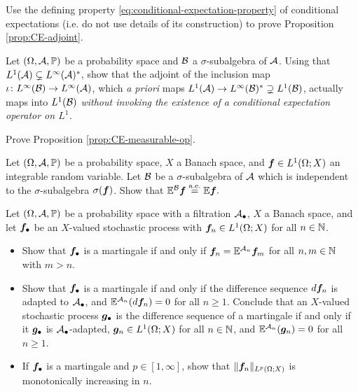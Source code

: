 \begin{exercise}\label{ex:CE-adjoint}
  Use the defining property \eqref{eq:conditional-expectation-property} of conditional expectations (i.e. do not use details of its construction) to prove Proposition \ref{prop:CE-adjoint}.
\end{exercise}

\begin{exercise}\label{ex:conditional-expectation-as-adjoint}
  Let $(\Omega,\mathcal{A},\mathbb{P})$ be a probability space and $\mathcal{B}$ a $\sigma$-subalgebra of $\mathcal{A}$.
  Using that $L^1(\mathcal{A}) \subsetneq L^\infty(\mathcal{A})^*$, show that the adjoint of the inclusion map $\iota \colon L^\infty(\mathcal{B}) \rightarrow L^\infty(\mathcal{A})$, which \emph{a priori} maps $L^1(\mathcal{A}) \to L^\infty(\mathcal{B})^* \supsetneq L^1(\mathcal{B})$, actually maps into $L^1(\mathcal{B})$ \emph{without invoking the existence of a conditional expectation operator on $L^1$.}
\end{exercise}

\begin{exercise}\label{ex:CE-measurable-op}
  Prove Proposition \ref{prop:CE-measurable-op}.
\end{exercise}

\begin{exercise}\label{ex:ce-ind}
  Let $(\Omega,\mathcal{A},\mathbb{P})$ be a probability space, $X$ a Banach space, and $\bm{f} \in L^1(\Omega;X)$ an integrable random variable.
  Let $\mathcal{B}$ be a $\sigma$-subalgebra of $\mathcal{A}$ which is independent to the $\sigma$-subalgebra $\sigma(\bm{f})$.
  Show that $\mathbb{E}^{\mathcal{B}} \bm{f} \stackrel{\mathrm{a.e.}}{=} \mathbb{E} \bm{f}.$
\end{exercise}

\begin{exercise}\label{ex:martingale-elementary-properties}
  Let $(\Omega,\mathcal{A},\mathbb{P})$ be a probability space with a filtration $\mathcal{A}_{\bullet}$, $X$ a Banach space, and let $\bm{f}_{\bullet}$ be an $X$-valued stochastic process with $\bm{f}_{n} \in L^1(\Omega;X)$ for all $n \in \mathbb{N}$.
  \begin{itemize}
  \item
    Show that $\bm{f}_{\bullet}$ is a martingale if and only if $\bm{f}_n = \mathbb{E}^{\mathcal{A}_n} \bm{f}_m$ for all $n,m \in \mathbb{N}$ with $m > n$.
  \item
    Show that $\bm{f}_{\bullet}$ is a martingale if and only if the difference sequence $d\bm{f}_{n}$ is adapted to $\mathcal{A}_{\bullet}$, and $\mathbb{E}^{\mathcal{A}_{n}} (d\bm{f}_{n}) = 0$ for all $n \geq 1$.
    Conclude that an $X$-valued stochastic process $\bm{g}_{\bullet}$ is the difference sequence of a martingale if and only if it $\bm{g}_{\bullet}$ is $\mathcal{A}_{\bullet}$-adapted, $\bm{g}_{n} \in L^1(\Omega;X)$ for all $n \in \mathbb{N}$, and $\mathbb{E}^{\mathcal{A}_{n}}(\bm{g}_{n}) = 0$ for all $n \geq 1$.
  \item
    If $\bm{f}_{\bullet}$ is a martingale and $p \in [1,\infty]$, show that $\|\bm{f}_{n}\|_{L^p(\Omega;X)}$ is monotonically increasing in $n$.
  \end{itemize}
\end{exercise}

